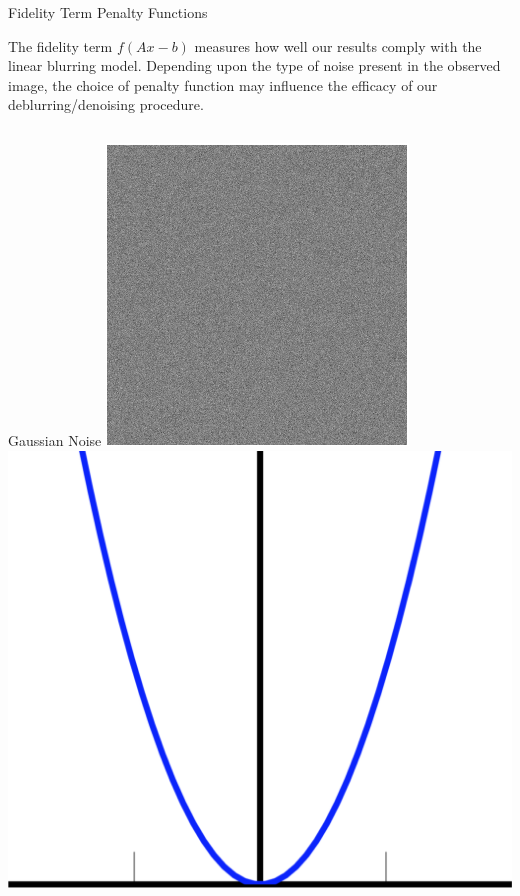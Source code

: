 \documentclass[12pt]{beamer}
\begin{document}
\begin{frame}{Fidelity Term Penalty Functions}

The fidelity term $f(Ax-b)$ measures how well our results comply with the linear blurring model. Depending upon the type of noise present in the observed image, the choice of penalty function may influence the efficacy of our deblurring/denoising procedure. 

\begin{columns}[T]
	\begin{column}{0.45\linewidth}
		\begin{block}{Gaussian Noise}
		\quad \includegraphics[scale=0.15]{../figures/gaussian_noise.png} \hspace{1.5em}
		\includegraphics[scale=0.1]{../figures/quadratic} \\

\end{block}
\end{column}
\end{columns}
\end{frame}
\end{document}

